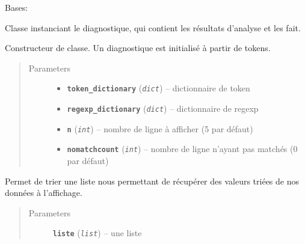 \documentclass[letterpaper,10pt,english]{sphinxmanual}
\begin{document}
\begin{fulllineitems}
\label{loganalyser:loganalyser.diagnostique.Diagnostique}
Bases: 

Classe instanciant le diagnostique, qui contient les résultats d'analyse et les fait.

\begin{fulllineitems}
\label{loganalyser:loganalyser.diagnostique.Diagnostique.__init__}
Constructeur de classe. Un diagnostique est initialisé à partir de tokens.
\begin{quote}\begin{description}
\item[{Parameters}] \leavevmode\begin{itemize}
\item {} 
\textbf{\texttt{token\_dictionary}} (\emph{\texttt{dict}}) -- dictionnaire de token

\item {} 
\textbf{\texttt{regexp\_dictionary}} (\emph{\texttt{dict}}) -- dictionnaire de regexp

\item {} 
\textbf{\texttt{n}} (\emph{\texttt{int}}) -- nombre de ligne à afficher (5 par défaut)

\item {} 
\textbf{\texttt{nomatchcount}} (\emph{\texttt{int}}) -- nombre de ligne n'ayant pas matchés (0 par défaut)

\end{itemize}

\end{description}\end{quote}

\end{fulllineitems}


\begin{fulllineitems}
\label{loganalyser:loganalyser.diagnostique.Diagnostique.get_indices_top}
Permet de trier une liste nous permettant de récupérer des valeurs triées de nos données à l'affichage.
\begin{quote}\begin{description}
\item[{Parameters}] \leavevmode
\textbf{\texttt{liste}} (\emph{\texttt{list}}) -- une liste


\end{description}
\end{quote}
\end{fulllineitems}
\end{fulllineitems}
\end{document}
